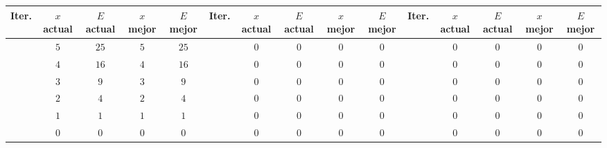 \begin{table}[H]
\centering
\scriptsize
\setlength{\tabcolsep}{1.2pt}
\renewcommand{\arraystretch}{1.15}
\begin{tabular}{|c|c|c|c|c|c|c|c|c|c|c|c|c|c|c|}
\hline
\rowcolor{encabezado}\textbf{Iter.} & \textbf{$x$ actual} & \textbf{$E$ actual} & \textbf{$x$ mejor} & \textbf{$E$ mejor} & \textbf{Iter.} & \textbf{$x$ actual} & \textbf{$E$ actual} & \textbf{$x$ mejor} & \textbf{$E$ mejor} & \textbf{Iter.} & \textbf{$x$ actual} & \textbf{$E$ actual} & \textbf{$x$ mejor} & \textbf{$E$ mejor} \\
\hline
\cellcolor{destacado}{\bfseries\boldmath $0$} & \cellcolor{destacado}$5$ & \cellcolor{destacado}$25$ & \cellcolor{destacado}$5$ & \cellcolor{destacado}$25$ & \cellcolor{iteracion}{\bfseries\boldmath $34$} & $0$ & $0$ & $0$ & $0$ & \cellcolor{iteracion}{\bfseries\boldmath $68$} & $0$ & $0$ & $0$ & $0$ \\
\hline
\cellcolor{iteracion}{\bfseries\boldmath $1$} & \cellcolor{cebra}$4$ & \cellcolor{cebra}$16$ & \cellcolor{cebra}$4$ & \cellcolor{cebra}$16$ & \cellcolor{iteracion}{\bfseries\boldmath $35$} & \cellcolor{cebra}$0$ & \cellcolor{cebra}$0$ & \cellcolor{cebra}$0$ & \cellcolor{cebra}$0$ & \cellcolor{iteracion}{\bfseries\boldmath $69$} & \cellcolor{cebra}$0$ & \cellcolor{cebra}$0$ & \cellcolor{cebra}$0$ & \cellcolor{cebra}$0$ \\
\hline
\cellcolor{iteracion}{\bfseries\boldmath $2$} & $3$ & $9$ & $3$ & $9$ & \cellcolor{iteracion}{\bfseries\boldmath $36$} & $0$ & $0$ & $0$ & $0$ & \cellcolor{iteracion}{\bfseries\boldmath $70$} & $0$ & $0$ & $0$ & $0$ \\
\hline
\cellcolor{iteracion}{\bfseries\boldmath $3$} & \cellcolor{cebra}$2$ & \cellcolor{cebra}$4$ & \cellcolor{cebra}$2$ & \cellcolor{cebra}$4$ & \cellcolor{iteracion}{\bfseries\boldmath $37$} & \cellcolor{cebra}$0$ & \cellcolor{cebra}$0$ & \cellcolor{cebra}$0$ & \cellcolor{cebra}$0$ & \cellcolor{iteracion}{\bfseries\boldmath $71$} & \cellcolor{cebra}$0$ & \cellcolor{cebra}$0$ & \cellcolor{cebra}$0$ & \cellcolor{cebra}$0$ \\
\hline
\cellcolor{iteracion}{\bfseries\boldmath $4$} & $1$ & $1$ & $1$ & $1$ & \cellcolor{iteracion}{\bfseries\boldmath $38$} & $0$ & $0$ & $0$ & $0$ & \cellcolor{iteracion}{\bfseries\boldmath $72$} & $0$ & $0$ & $0$ & $0$ \\
\hline
\cellcolor{destacado}{\bfseries\boldmath $5$} & \cellcolor{destacado}$0$ & \cellcolor{destacado}$0$ & \cellcolor{destacado}$0$ & \cellcolor{destacado}$0$ & \cellcolor{iteracion}{\bfseries\boldmath $39$} & \cellcolor{cebra}$0$ & \cellcolor{cebra}$0$ & \cellcolor{cebra}$0$ & \cellcolor{cebra}$0$ & \cellcolor{iteracion}{\bfseries\boldmath $73$} & \cellcolor{cebra}$0$ & \cellcolor{cebra}$0$ & \cellcolor{cebra}$0$ & \cellcolor{cebra}$0$ \\

\end{tabular}
\end{table}
